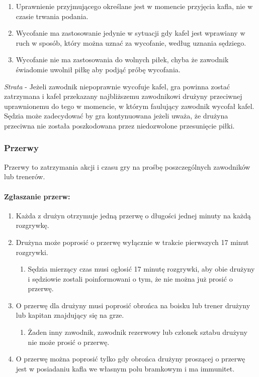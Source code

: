 \documentclass[12pt]{article}
\begin{document}
\begin{enumerate}
	\item
	      Uprawnienie przyjmującego określane jest w momencie przyjęcia kafla,
	      nie w czasie trwania podania.
	\item
	      Wycofanie ma zastosowanie jedynie w sytuacji gdy kafel jest wprawiany
	      w ruch w sposób, który można uznać za wycofanie, według uznania
	      sędziego.
	\item
	      Wycofanie nie ma zastosowania do wolnych piłek, chyba że zawodnik
	      świadomie uwolnił piłkę aby podjąć próbę wycofania.
\end{enumerate}

\emph{Strata} - Jeżeli zawodnik niepoprawnie wycofuje kafel, gra powinna
zostać zatrzymana i kafel przekazany najbliższemu zawodnikowi drużyny
przeciwnej uprawnionemu do tego w momencie, w którym faulujący zawodnik
wycofał kafel. Sędzia może zadecydować by gra kontynuowana jeżeli uważa,
że drużyna przeciwna nie została poszkodowana przez niedozwolone
przesunięcie piłki.

\subsubsection{Przerwy}

Przerwy to zatrzymania akcji i czasu gry na prośbę poszczególnych
zawodników lub trenerów.

\paragraph{Zgłaszanie przerw:}

\begin{enumerate}
	\item
	      Każda z drużyn otrzymuje jedną przerwę o długości jednej minuty na
	      każdą rozgrywkę.
	\item
	      Drużyna może poprosić o przerwę wyłącznie w trakcie pierwszych 17
	      minut rozgrywki.

	      \begin{enumerate}
		      \item
		            Sędzia mierzący czas musi ogłosić 17 minutę rozgrywki, aby obie
		            drużyny i sędziowie zostali poinformowani o tym, że nie można już
		            prosić o przerwę.
	      \end{enumerate}
	\item
	      O przerwę dla drużyny musi poprosić obrońca na boisku lub trener
	      drużyny lub kapitan znajdujący się na grze.

	      \begin{enumerate}
		      \item
		            Żaden inny zawodnik, zawodnik rezerwowy lub członek sztabu drużyny
		            nie może prosić o przerwę.
	      \end{enumerate}
	\item
	      O przerwę można poprosić tylko gdy obrońca drużyny proszącej o przerwę
	      jest w posiadaniu kafla we własnym polu bramkowym i ma immunitet.
\end{enumerate}
\end{document}
